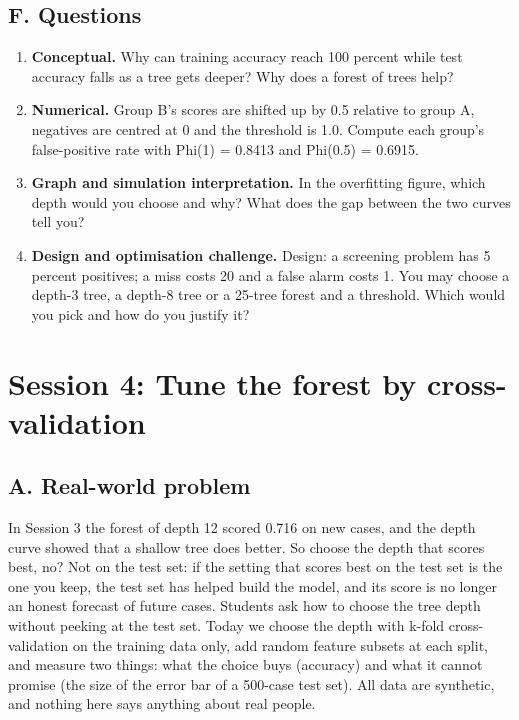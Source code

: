 \documentclass[11pt,a4paper]{article}
\begin{document}
\subsection*{F. Questions}
\begin{enumerate}[nosep]
\item \textbf{Conceptual.} Why can training accuracy reach 100 percent while test accuracy falls as a tree gets deeper? Why does a forest of trees help?
\item \textbf{Numerical.} Group B's scores are shifted up by 0.5 relative to group A, negatives are centred at 0 and the threshold is 1.0. Compute each group's false-positive rate with Phi(1) = 0.8413 and Phi(0.5) = 0.6915.
\item \textbf{Graph and simulation interpretation.} In the overfitting figure, which depth would you choose and why? What does the gap between the two curves tell you?
\item \textbf{Design and optimisation challenge.} Design: a screening problem has 5 percent positives; a miss costs 20 and a false alarm costs 1. You may choose a depth-3 tree, a depth-8 tree or a 25-tree forest and a threshold. Which would you pick and how do you justify it?
\end{enumerate}

\section{Session 4: Tune the forest by cross-validation}

\subsection*{A. Real-world problem}
In Session 3 the forest of depth 12 scored 0.716 on new cases, and the depth curve showed that a shallow tree does better. So choose the depth that scores best, no? Not on the test set: if the setting that scores best on the test set is the one you keep, the test set has helped build the model, and its score is no longer an honest forecast of future cases. Students ask how to choose the tree depth without peeking at the test set. Today we choose the depth with k-fold cross-validation on the training data only, add random feature subsets at each split, and measure two things: what the choice buys (accuracy) and what it cannot promise (the size of the error bar of a 500-case test set). All data are synthetic, and nothing here says anything about real people.
\end{document}
